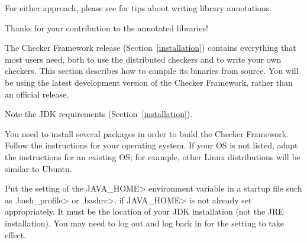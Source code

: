 For either approach, please see  for
tips about writing library annotations.

Thanks for your contribution to the annotated libraries!



The Checker Framework release (Section~\ref{installation}) contains
everything that most users need, both to use the distributed checkers and
to write your own checkers.  This section describes how to compile its
binaries from source.  You will be using the latest development version of
the Checker Framework, rather than an official release.


Note the JDK requirements (Section~\ref{installation}).



You need to install several packages in order to build the Checker
Framework.
Follow the instructions for your operating system.
If your OS is not listed, adapt the instructions for an existing OS;
for example, other Linux distributions will be similar to Ubuntu.

Put the setting of the \<JAVA\_HOME> environment variable in a startup file
such as \<.bash\_profile> or \<.bashrc>, if \<JAVA\_HOME> is not already
set appropriately.  It must be the location of your JDK
installation (not the JRE installation).
You may need to log out and log back in for the setting to take effect.

